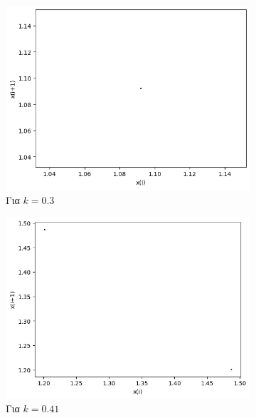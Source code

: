 \begin{figure}[ht]
	\centering	
	\begin{subfigure}[b]{0.4\linewidth}
		\centering
		\includegraphics[width=\linewidth]{LateX images/graphs/k03}
		\caption{Για $k=0.3$}
		\label{f:k1}
	\end{subfigure}
	\hfill
	\begin{subfigure}[b]{0.4\textwidth}
		\centering
		\includegraphics[width=\textwidth]{LateX images/graphs/k041}
		\caption{Για $k=0.41$}
		\label{f:k2}
	\end{subfigure}
	\hfill
	\begin{subfigure}[b]{0.4\textwidth}
		\centering

\end{subfigure}
\end{figure}
